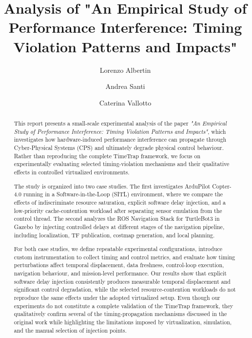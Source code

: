 \documentclass[sigconf]{acmart}
\begin{document}
\title{Analysis of "An Empirical Study of Performance Interference: 
Timing Violation Patterns and Impacts"}


\author{Lorenzo Albertin}

\author{Andrea Santi}

\author{Caterina Vallotto}

\renewcommand{\shortauthors}{Lorenzo Albertin, Andrea Santi, Caterina Vallotto}

\begin{abstract}
This report presents a small-scale experimental analysis of the paper \textit{"An Empirical Study of Performance Interference: Timing Violation Patterns and Impacts"}, which investigates how hardware-induced performance interference can propagate through Cyber-Physical Systems (CPS) and ultimately degrade physical control behaviour. Rather than reproducing the complete TimeTrap framework, we focus on experimentally evaluating selected timing-violation mechanisms and their qualitative effects in controlled virtualized environments.

\noindent The study is organized into two case studies. The first investigates ArduPilot Copter-4.0 running in a Software-in-the-Loop (SITL) environment, where we compare the effects of indiscriminate resource saturation, explicit software delay injection, and a low-priority cache-contention workload after separating sensor emulation from the control thread. The second analyzes the ROS Navigation Stack for TurtleBot3 in Gazebo by injecting controlled delays at different stages of the navigation pipeline, including localization, TF publication, costmap generation, and local planning.

\noindent For both case studies, we define repeatable experimental configurations, introduce custom instrumentation to collect timing and control metrics, and evaluate how timing perturbations affect temporal displacement, data freshness, control-loop execution, navigation behaviour, and mission-level performance. Our results show that explicit software delay injection consistently produces measurable temporal displacement and significant control degradation, while the selected resource-contention workloads do not reproduce the same effects under the adopted virtualized setup. Even though our experiments do not constitute a complete validation of the TimeTrap framework, they qualitatively confirm several of the timing-propagation mechanisms discussed in the original work while highlighting the limitations imposed by virtualization, simulation, and the manual selection of injection points.
\end{abstract}



\maketitle








\end{document}

